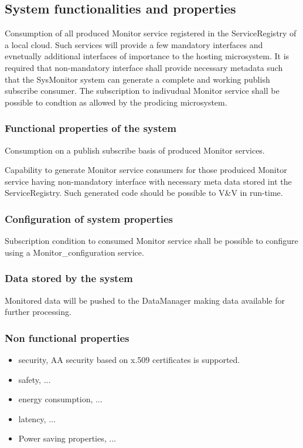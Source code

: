 \documentclass[a4paper]{arrowhead}
\begin{document}
\subsection{System functionalities and properties}
\label{sec:properties}

Consumption of all produced Monitor service registered in the
ServiceRegistry of a local cloud. Such
services will provide a few mandatory interfaces and evnetually
additional interfaces of importance to the hosting microsystem. It is
required that non-mandatory interface shall provide necessary metadata
such that the SysMonitor system can generate a complete and working publish subscribe
consumer. The subscription to indivudual Monitor service shall be
possible to condtion as allowed by the prodicing microsystem.




\subsubsection {Functional properties of the system}

Consumption on a publish subscribe basis of produced Monitor services.

Capability to generate Monitor service consumers for those produiced
Monitor service having non-mandatory interface with necessary meta
data stored int the ServiceRegistry. Such generated code should be
possible to V\&V in run-time.  


\subsubsection {Configuration of system properties}

Subscription condition to consumed Monitor service shall be possible
to configure using a Monitor\_configuration service.

\subsubsection {Data stored by the system}

Monitored data will be pushed to the DataManager making data available
for further processing.  

\subsubsection {Non functional properties}
\begin{itemize}
  \item security, AA security based on x.509 certificates is supported. 
  \item safety, ...
  \item energy consumption,  ...
  \item latency,  ...
  \item Power saving properties,  ... 
\end{itemize}
\end{document}
